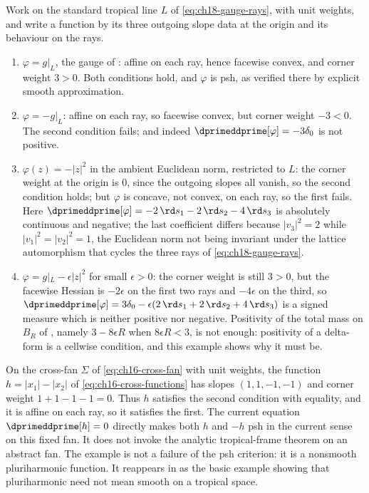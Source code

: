 \begin{example}
\label{ex:ch18-positivity-four-cases}
Work on the standard tropical line $L$ of \eqref{eq:ch18-gauge-rays}, with
unit weights, and write a function by its three outgoing slope data at the
origin and its behaviour on the rays.
\begin{enumerate}
\item\label{itm:ch18-4c:both}
 $\varphi=g|_L$, the gauge of : affine on each ray,
 hence facewise convex, and corner weight $3>0$.  Both conditions hold, and
 $\varphi$ is psh, as verified there by explicit smooth approximation.
\item\label{itm:ch18-4c:cornerfails}
 $\varphi=-g|_L$: affine on each ray, so facewise convex, but corner weight
 $-3<0$.  The second condition fails; and indeed
 $\dprimeddprime[\varphi]=-3\delta_0$ is not positive.
\item\label{itm:ch18-4c:facefails}
 $\varphi(z)=-|z|^2$ in the ambient Euclidean norm, restricted to $L$: the
 corner weight at the origin is $0$, since the outgoing slopes all vanish,
 so the second condition holds; but $\varphi$ is concave, not convex, on
 each ray, so the first fails.  Here $\dprimeddprime[\varphi]=-2\,\rd s_1-2\,\rd s_2-4\,\rd s_3$ is
absolutely continuous and negative; the last coefficient differs because
$|v_3|^2=2$ while $|v_1|^2=|v_2|^2=1$, the Euclidean norm not being
invariant under the lattice automorphism that cycles the three rays of
\eqref{eq:ch18-gauge-rays}.
\item\label{itm:ch18-4c:mixed}
 $\varphi=g|_L-\epsilon|z|^2$ for small $\epsilon>0$: the corner weight is
 still $3>0$, but the facewise Hessian is $-2\epsilon$ on the first two rays and
$-4\epsilon$ on the third, so
$\dprimeddprime[\varphi]=3\delta_0-\epsilon(2\,\rd s_1+2\,\rd s_2+4\,\rd s_3)$
is a signed measure which is neither positive nor negative.  Positivity of the total
 mass on $B_R$ of , namely $3-8\epsilon R$
when $8\epsilon R<3$, is not enough:
 positivity of a delta-form is a cellwise condition, and this example shows
 why it must be.
\end{enumerate}
\end{example}

\begin{example}
\label{ex:ch18-cross-positivity}
On the cross-fan $\Sigma$ of \eqref{eq:ch16-cross-fan} with unit weights,
the function $h=|x_1|-|x_2|$ of \eqref{eq:ch16-cross-functions} has slopes
$(1,1,-1,-1)$ and corner weight $1+1-1-1=0$.  Thus $h$ satisfies the second
condition with equality, and it is affine on each ray, so it satisfies the
first.  The current equation $\dprimeddprime[h]=0$ directly makes both
$h$ and $-h$ psh in the current sense on this fixed fan.  It does not
invoke the analytic tropical-frame theorem on an abstract fan.  The example
is not a failure of the
psh criterion: it is a nonsmooth pluriharmonic function.  It reappears in
 as the basic example showing that pluriharmonic need
not mean smooth on a tropical space.
\end{example}

